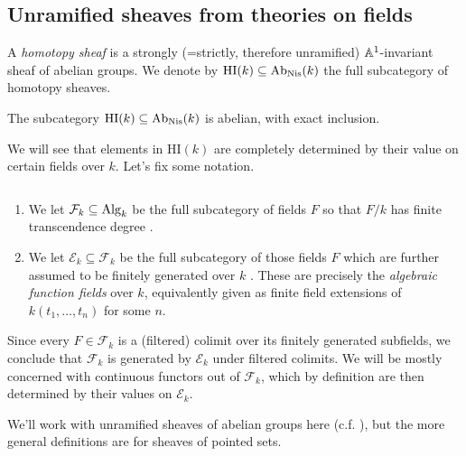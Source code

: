 \documentclass[11pt,openany]{book}
\providecommand{\HI}{\mathrm{HI}}
\begin{document}
\subsection{Unramified sheaves from theories on fields}



\begin{definition}
A \textit{homotopy sheaf} is a strongly (=strictly, therefore unramified) $\mathbb{A}^1$-invariant sheaf of abelian groups. We denote by $\HI(k) \subseteq \Ab_\Nis(k)$ the full subcategory of homotopy sheaves.
\end{definition}


\begin{theorem} \cite[6.24]{Morel}
The subcategory $\HI(k) \subseteq \Ab_\Nis(k)$ is abelian, with exact inclusion.
\end{theorem}

We will see that elements in $\HI(k)$ are completely determined by their value on certain fields over $k$. Let's fix some notation.


\begin{notation} $\ $
\begin{enumerate}
    \item We let $\mathcal{F}_k \subseteq \mathrm{Alg}_k$ be the full subcategory of fields $F$ so that $F/k$ has finite transcendence degree \cite[p.~vi]{Morel}.
    \item We let $\mathcal{E}_k \subseteq \mathcal{F}_k$ be the full subcategory of those fields $F$ which are further assumed to be finitely generated over $k$ \cite[p.~43]{Deglise-finite-corr}. These are precisely the \textit{algebraic function fields} over $k$, equivalently given as finite field extensions of $k(t_1, \ldots, t_n)$ for some $n$.
\end{enumerate}
\end{notation}

\begin{remark} Since every $F \in \mathcal{F}_k$ is a (filtered) colimit over its finitely generated subfields, we conclude that $\mathcal{F}_k$ is generated by $\mathcal{E}_k$ under filtered colimits. We will be mostly concerned with continuous functors out of $\mathcal{F}_k$, which by definition are then determined by their values on $\mathcal{E}_k$.
\end{remark}


We'll work with unramified sheaves of abelian groups here (c.f. \cite[\S1.5]{Feld-thesis}), but the more general definitions are for sheaves of pointed sets.
\end{document}

